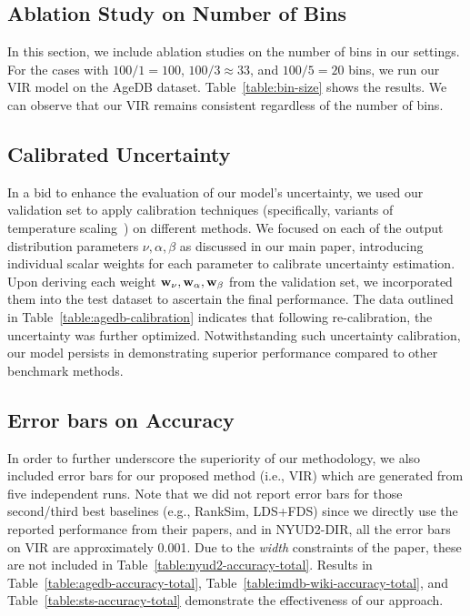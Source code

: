 \subsection{Ablation Study on Number of Bins} \label{sec:ablation-bins}

In this section, we include ablation studies on the number of bins in our settings. For the cases with $100/1=100$, $100/3\approx 33$, and $100/5=20$ bins, we run our VIR model on the AgeDB dataset. Table~\ref{table:bin-size} shows the results. We can observe that our VIR remains consistent regardless of the number of bins.

\subsection{Calibrated Uncertainty}

{In a bid to enhance the evaluation of our model's uncertainty, we used our validation set to apply calibration techniques (specifically, variants of temperature scaling~\cite{TS}) on different methods. We focused on each of the output distribution parameters $\nu, \alpha, \beta$ as discussed in our main paper, introducing individual scalar weights for each parameter to calibrate uncertainty estimation. Upon deriving each weight ${\bf w}_{\nu}, {\bf w}_{\alpha}, {\bf w}_{\beta}$ from the validation set, we incorporated them into the test dataset to ascertain the final performance. The data outlined in Table~\ref{table:agedb-calibration} indicates that following re-calibration, the uncertainty was further optimized. Notwithstanding such uncertainty calibration, our model persists in demonstrating superior performance compared to other benchmark methods.}

\subsection{Error bars on Accuracy}
{In order to further underscore the superiority of our methodology, we also included error bars for our proposed method (i.e., VIR) which are generated from five independent runs. Note that we did not report error bars for those second/third best baselines (e.g., RankSim, LDS+FDS) since we directly use the reported performance from their papers, and in NYUD2-DIR, all the error bars on VIR are approximately 0.001. Due to the \emph{width} constraints of the paper, these are not included in Table~\ref{table:nyud2-accuracy-total}. Results in Table~\ref{table:agedb-accuracy-total}, Table~\ref{table:imdb-wiki-accuracy-total}, and Table~\ref{table:sts-accuracy-total} demonstrate the effectiveness of our approach.}

